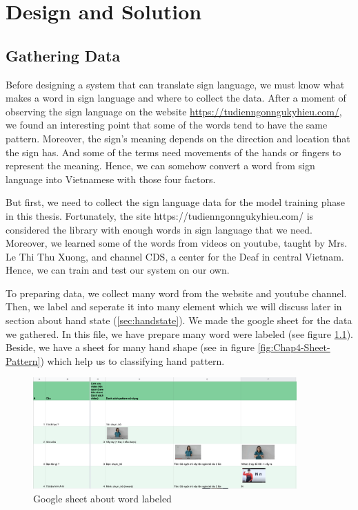 \chapter{Design and Solution}
\section{Gathering Data}



Before designing a system that can translate sign language, we must know what makes a word in sign language and where to collect the data. After a moment of observing the sign language on the website \url{https://tudienngonngukyhieu.com/}, we found an interesting point that some of the words tend to have the same pattern. Moreover, the sign's meaning depends on the direction and location that the sign has. And some of the terms need movements of the hands or fingers to represent the meaning. Hence, we can somehow convert a word from sign language into Vietnamese with those four factors.

But first, we need to collect the sign language data for the model training phase in this thesis. Fortunately, the site https://tudienngonngukyhieu.com/ is considered the library with enough words in sign language that we need. Moreover, we learned some of the words from videos on youtube, taught by Mrs. Le Thi Thu Xuong, and channel CDS, a center for the Deaf in central Vietnam. Hence, we can train and test our system on our own.

To preparing data, we collect many word from the website and youtube channel. Then, we label and seperate it into many element which we will discuss later in section about hand state (\ref{sec:handstate}). We made the google sheet for the data we gathered. In this file, we have prepare many word were labeled (see figure \ref{fig:Chap4-Label-Word}). Beside, we have a sheet for many hand shape (see in figure \ref{fig:Chap4-Sheet-Pattern}) which help us to classifying hand pattern.


\begin{figure}[H]
	\centering
	\includegraphics[width=0.9\textwidth]{img/Chap4/Label-Word.png}
	\caption{Google sheet about word labeled}
	\label{fig:Chap4-Label-Word}
\end{figure}

